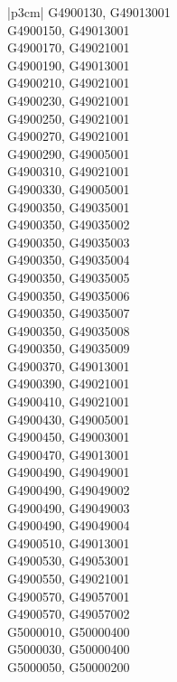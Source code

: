 \begin{customLongTable}{ |p{3cm}| }
G4900130, G49013001 \\ \hline
G4900150, G49013001 \\ \hline
G4900170, G49021001 \\ \hline
G4900190, G49013001 \\ \hline
G4900210, G49021001 \\ \hline
G4900230, G49021001 \\ \hline
G4900250, G49021001 \\ \hline
G4900270, G49021001 \\ \hline
G4900290, G49005001 \\ \hline
G4900310, G49021001 \\ \hline
G4900330, G49005001 \\ \hline
G4900350, G49035001 \\ \hline
G4900350, G49035002 \\ \hline
G4900350, G49035003 \\ \hline
G4900350, G49035004 \\ \hline
G4900350, G49035005 \\ \hline
G4900350, G49035006 \\ \hline
G4900350, G49035007 \\ \hline
G4900350, G49035008 \\ \hline
G4900350, G49035009 \\ \hline
G4900370, G49013001 \\ \hline
G4900390, G49021001 \\ \hline
G4900410, G49021001 \\ \hline
G4900430, G49005001 \\ \hline
G4900450, G49003001 \\ \hline
G4900470, G49013001 \\ \hline
G4900490, G49049001 \\ \hline
G4900490, G49049002 \\ \hline
G4900490, G49049003 \\ \hline
G4900490, G49049004 \\ \hline
G4900510, G49013001 \\ \hline
G4900530, G49053001 \\ \hline
G4900550, G49021001 \\ \hline
G4900570, G49057001 \\ \hline
G4900570, G49057002 \\ \hline
G5000010, G50000400 \\ \hline
G5000030, G50000400 \\ \hline
G5000050, G50000200 \\ \hline

\end{customLongTable}
